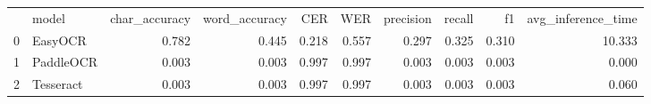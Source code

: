 \begin{tabular}{llrrrrrrrr}
 & model & char_accuracy & word_accuracy & CER & WER & precision & recall & f1 & avg_inference_time \\
0 & EasyOCR & 0.782 & 0.445 & 0.218 & 0.557 & 0.297 & 0.325 & 0.310 & 10.333 \\
1 & PaddleOCR & 0.003 & 0.003 & 0.997 & 0.997 & 0.003 & 0.003 & 0.003 & 0.000 \\
2 & Tesseract & 0.003 & 0.003 & 0.997 & 0.997 & 0.003 & 0.003 & 0.003 & 0.060 \\
\end{tabular}
